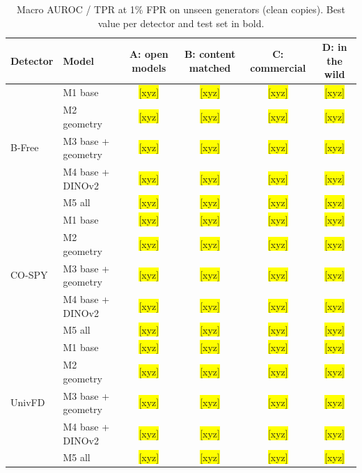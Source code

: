 \documentclass[11pt,a4paper]{article}
\newcommand{\xyz}[1][]{\colorbox{yellow}{[xyz]}}
\begin{document}
\begin{table}[t]
\centering
\caption{Macro AUROC / TPR at 1\% FPR on unseen generators (clean copies). Best value per detector and test set in bold.}
\label{tab:main}
\small
\begin{tabular}{@{}llcccc@{}}
\toprule
Detector & Model & A: open models & B: content matched & C: commercial & D: in the wild \\
\midrule
\multirow{5}{*}{B-Free} & M1 base & \xyz[main.bfree.M1.A] & \xyz[main.bfree.M1.B] & \xyz[main.bfree.M1.C] & \xyz[main.bfree.M1.D] \\
 & M2 geometry & \xyz[main.bfree.M2.A] & \xyz[main.bfree.M2.B] & \xyz[main.bfree.M2.C] & \xyz[main.bfree.M2.D] \\
 & M3 base + geometry & \xyz[main.bfree.M3.A] & \xyz[main.bfree.M3.B] & \xyz[main.bfree.M3.C] & \xyz[main.bfree.M3.D] \\
 & M4 base + DINOv2 & \xyz[main.bfree.M4.A] & \xyz[main.bfree.M4.B] & \xyz[main.bfree.M4.C] & \xyz[main.bfree.M4.D] \\
 & M5 all & \xyz[main.bfree.M5.A] & \xyz[main.bfree.M5.B] & \xyz[main.bfree.M5.C] & \xyz[main.bfree.M5.D] \\
\midrule
\multirow{5}{*}{CO-SPY} & M1 base & \xyz[main.cospy.M1.A] & \xyz[main.cospy.M1.B] & \xyz[main.cospy.M1.C] & \xyz[main.cospy.M1.D] \\
 & M2 geometry & \xyz[main.cospy.M2.A] & \xyz[main.cospy.M2.B] & \xyz[main.cospy.M2.C] & \xyz[main.cospy.M2.D] \\
 & M3 base + geometry & \xyz[main.cospy.M3.A] & \xyz[main.cospy.M3.B] & \xyz[main.cospy.M3.C] & \xyz[main.cospy.M3.D] \\
 & M4 base + DINOv2 & \xyz[main.cospy.M4.A] & \xyz[main.cospy.M4.B] & \xyz[main.cospy.M4.C] & \xyz[main.cospy.M4.D] \\
 & M5 all & \xyz[main.cospy.M5.A] & \xyz[main.cospy.M5.B] & \xyz[main.cospy.M5.C] & \xyz[main.cospy.M5.D] \\
\midrule
\multirow{5}{*}{UnivFD} & M1 base & \xyz[main.univfd.M1.A] & \xyz[main.univfd.M1.B] & \xyz[main.univfd.M1.C] & \xyz[main.univfd.M1.D] \\
 & M2 geometry & \xyz[main.univfd.M2.A] & \xyz[main.univfd.M2.B] & \xyz[main.univfd.M2.C] & \xyz[main.univfd.M2.D] \\
 & M3 base + geometry & \xyz[main.univfd.M3.A] & \xyz[main.univfd.M3.B] & \xyz[main.univfd.M3.C] & \xyz[main.univfd.M3.D] \\
 & M4 base + DINOv2 & \xyz[main.univfd.M4.A] & \xyz[main.univfd.M4.B] & \xyz[main.univfd.M4.C] & \xyz[main.univfd.M4.D] \\
 & M5 all & \xyz[main.univfd.M5.A] & \xyz[main.univfd.M5.B] & \xyz[main.univfd.M5.C] & \xyz[main.univfd.M5.D] \\
\bottomrule
\end{tabular}
\end{table}
\end{document}
